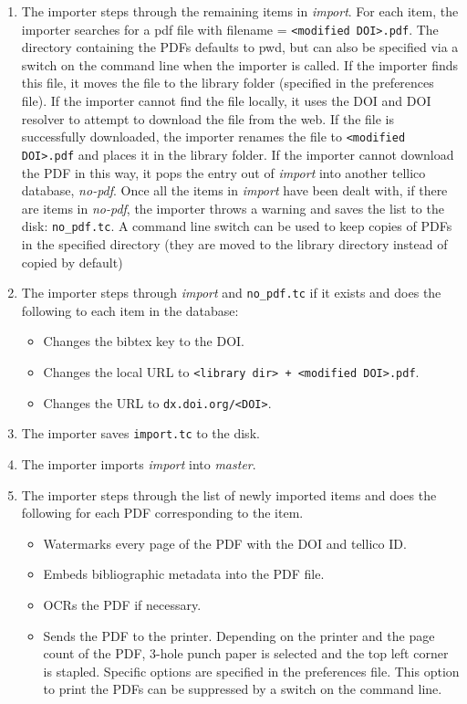 \documentclass[letterpaper,12pt]{article}
\begin{document}
\begin{enumerate}
\item The importer steps through the remaining items in \emph{import}. For each item, the importer searches for a pdf file with filename = \verb|<modified DOI>.pdf|. The directory containing the PDFs defaults to pwd, but can also be specified via a switch on the command line when the importer is called. If the importer finds this file, it moves the file to the library folder (specified in the preferences file). If the importer cannot find the file locally, it uses the DOI and DOI resolver to attempt to download the file from the web. If the file is successfully downloaded, the importer renames the file to \verb|<modified DOI>.pdf| and places it in the library folder. If the importer cannot download the PDF in this way, it pops the entry out of \emph{import} into another tellico database, \emph{no-pdf}. Once all the items in \emph{import} have been dealt with, if there are items in \emph{no-pdf}, the importer throws a warning and saves the list to the disk: \verb|no_pdf.tc|. A command line switch can be used to keep copies of PDFs in the specified directory (they are moved to the library directory instead of copied by default)

\item The importer steps through \emph{import} and \verb|no_pdf.tc| if it exists and does the following to each item in the database:

\begin{itemize}
\item Changes the bibtex key to the DOI.
\item Changes the local URL to \verb|<library dir> + <modified DOI>.pdf|.
\item Changes the URL to \verb|dx.doi.org/<DOI>|.
\end{itemize}

\item The importer saves \verb|import.tc| to the disk.

\item The importer imports \emph{import} into \emph{master}.

\item The importer steps through the list of newly imported items and does the following for each PDF corresponding to the item.

\begin{itemize}
\item Watermarks every page of the PDF with the DOI and tellico ID.
\item Embeds bibliographic metadata into the PDF file.
\item OCRs the PDF if necessary.
\item Sends the PDF to the printer. Depending on the printer and the page count of the PDF, 3-hole punch paper is selected and the top left corner is stapled. Specific options are specified in the preferences file. This option to print the PDFs can be suppressed by a switch on the command line.
\end{itemize}


\end{enumerate}
\end{document}
